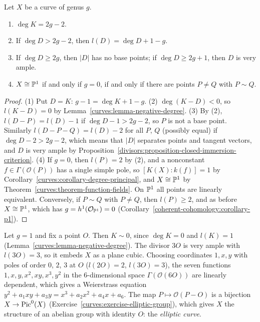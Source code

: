 \begin{corollary}\label{curves:corollary-riemann-roch-consequences}
Let $X$ be a curve of genus $g$.
\begin{enumerate}
\item $\deg K = 2g - 2$.
\item If $\deg D > 2g - 2$, then $l(D) = \deg D + 1 - g$.
\item If $\deg D \geq 2g$, then $|D|$ has no base points; if $\deg D \geq 2g + 1$, then $D$ is very ample.
\item $X \cong \mathbb{P}^1$ if and only if $g = 0$, if and only if there are points $P \neq Q$ with $P \sim Q$.
\end{enumerate}
\end{corollary}

\begin{proof}
(1) Put $D = K$: $g - 1 = \deg K + 1 - g$. (2) $\deg(K - D) < 0$, so $l(K - D) = 0$ by Lemma~\ref{curves:lemma-negative-degree}. (3) By (2), $l(D - P) = l(D) - 1$ if
$\deg D - 1 > 2g - 2$, so $P$ is not a base point. Similarly $l(D - P - Q) = l(D) - 2$ for all $P$, $Q$ (possibly equal) if $\deg D - 2 > 2g - 2$, which means that $|D|$
separates points and tangent vectors, and $D$ is very ample by Proposition~\ref{divisors:proposition-closed-immersion-criterion}. (4) If $g = 0$, then $l(P) = 2$ by (2), and a
nonconstant $f \in \Gamma(\mathcal{O}(P))$ has a single simple pole, so $[K(X) : k(f)] = 1$ by Corollary~\ref{curves:corollary-degree-principal}, and $X \cong \mathbb{P}^1$ by
Theorem~\ref{curves:theorem-function-fields}. On $\mathbb{P}^1$ all points are linearly equivalent. Conversely, if $P \sim Q$ with $P \neq Q$, then $l(P) \geq 2$, and as before
$X \cong \mathbb{P}^1$, which has $g = h^1(\mathcal{O}_{\mathbb{P}^1}) = 0$ (Corollary~\ref{coherent-cohomology:corollary-p1}).
\end{proof}

\begin{example}\label{curves:example-elliptic}
Let $g = 1$ and fix a point $O$. Then $K \sim 0$, since $\deg K = 0$ and $l(K) = 1$ (Lemma~\ref{curves:lemma-negative-degree}). The divisor $3O$ is very ample with
$l(3O) = 3$, so it embeds $X$ as a plane cubic. Choosing coordinates $1, x, y$ with poles of order $0$, $2$, $3$ at $O$ ($l(2O) = 2$, $l(3O) = 3$), the seven functions
$1, x, y, x^2, xy, x^3, y^2$ in the $6$-dimensional space $\Gamma(\mathcal{O}(6O))$ are linearly dependent, which gives a Weierstrass equation
$y^2 + a_1xy + a_3y = x^3 + a_2x^2 + a_4x + a_6$. The map $P \mapsto \mathcal{O}(P - O)$ is a bijection $X \to \operatorname{Pic}^0(X)$ (Exercise~\ref{curves:exercise-elliptic-group}), which gives
$X$ the structure of an abelian group with identity $O$: the \emph{elliptic curve}.
\end{example}

